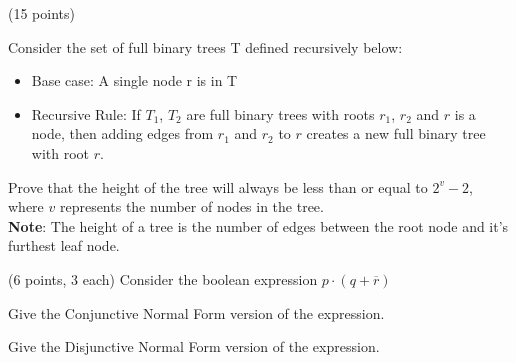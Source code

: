 \documentclass[11pt]{article}
\begin{document}
  \bigskip
	\begin{problem} (15 points)
		
	Consider the set of full binary trees T defined recursively below:
		\begin{itemize}
			\item Base case: A single node r is in T
			\item Recursive Rule: If $T_1$, $T_2$ are full binary trees with roots $r_1$, $r_2$ and $r$ is a node, then adding edges from $r_1$ and $r_2$ to $r$ creates a new full binary tree with root $r$. 
		\end{itemize}
		
		Prove that the height of the tree will always be less than or equal to $2^v - 2$, where $v$ represents the number of nodes in the tree.\\
		\textbf{Note}: The height of a tree is the number of edges between the root node and it's furthest leaf node.\\
		

		
		
\end{problem}

\bigskip

\begin{problem} (6 points, 3 each)
Consider the boolean expression $p \cdot (q + \overline{r})$

\begin{ppart}
Give the Conjunctive Normal Form version of the expression.


\end{ppart}

\begin{ppart}
Give the Disjunctive Normal Form version of the expression.


\end{ppart}
\end{problem}
\end{document}

